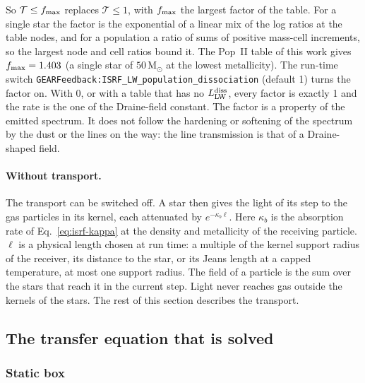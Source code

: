 So $\mathcal T\le f_{\rm max}$ replaces $\mathcal T\le1$, with $f_{\rm max}$
the largest factor of the table. For a single star the factor is the
exponential of a linear mix of the log ratios at the table nodes, and for a
population a ratio of sums of positive mass-cell increments, so the largest
node and cell ratios bound it. The Pop~II table of this work gives
$f_{\rm max}=1.403$ (a single star of $50$\,M$_\odot$ at the lowest
metallicity). The run-time switch
\texttt{GEARFeedback:ISRF\_LW\_population\_dissociation} (default 1) turns
the factor on. With 0, or with a table that has no
$L_{\rm LW}^{\rm diss}$, every factor is exactly 1 and the rate is the one of
the Draine-field constant. The factor is a property of the emitted spectrum.
It does not follow the hardening or softening of the spectrum by the dust or
the lines on the way: the line transmission is that of a Draine-shaped field.

\paragraph{Without transport.} The transport can be switched off. A star then
gives the light of its step to the gas particles in its kernel, each
attenuated by $e^{-\kappa_b\ell}$. Here $\kappa_b$ is the absorption rate of
Eq.~\eqref{eq:isrf-kappa} at the density and metallicity of the receiving
particle. $\ell$ is a physical length chosen at run time: a multiple of the
kernel support radius of the receiver, its distance to the star, or its Jeans
length at a capped temperature, at most one support radius. The field of a
particle is the sum over the stars that reach it in the current step. Light
never reaches gas outside the kernels of the stars. The rest of this section
describes the transport.

\subsection{The transfer equation that is solved}
\label{sec:isrf-rte}

\subsubsection{Static box}
\label{sec:isrf-rte-static}

